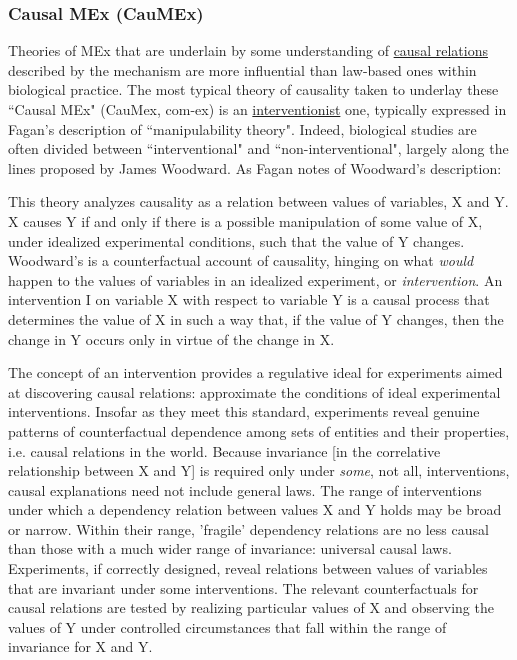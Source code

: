 \subsubsection{Causal MEx (CauMEx)}
Theories of MEx that are underlain by some understanding of \hyperref[causality]{causal relations} described by the mechanism are more influential than law-based ones within biological practice. The most typical theory of causality taken to underlay these ``Causal MEx" (CauMex, com-ex) is an \hyperref[causality]{interventionist} one, typically expressed in Fagan's description of ``manipulability theory". Indeed, biological studies are often divided between ``interventional" and ``non-interventional", largely along the lines proposed by James Woodward. As Fagan notes of Woodward's description:

\begin{longquote}
This theory analyzes causality as a relation between values of variables, X and Y. X causes Y if and only if there is a possible
manipulation of some value of X, under idealized experimental conditions, such that the value of Y changes. Woodward's is a counterfactual
account of causality, hinging on what \textit{would} happen to the values of
variables in an idealized experiment, or \textit{intervention}. An intervention I
on variable X with respect to variable Y is a causal process that determines the value of X in such a way that, if the value of Y changes, then
the change in Y occurs only in virtue of the change in X.

The concept of an intervention provides a regulative ideal for experiments aimed at discovering causal relations: approximate the conditions
of ideal experimental interventions. Insofar as they meet this standard,
experiments reveal genuine patterns of counterfactual dependence
among sets of entities and their properties, i.e. causal relations in the
world. Because invariance [in the correlative relationship between X and Y] is required only under \textit{some}, not all, interventions, causal explanations need not include general laws. The range
of interventions under which a dependency relation between values X
and Y holds may be broad or narrow. Within their range, 'fragile' dependency relations are no less causal than those with a much wider range of
invariance: universal causal laws. Experiments, if correctly designed,
reveal relations between values of variables that are invariant under
some interventions. The relevant counterfactuals for causal relations are
tested by realizing particular values of X and observing the values of Y
under controlled circumstances that fall within the range of invariance
for X and Y.
\cite[p.99]{Fagan2013}
\end{longquote}


